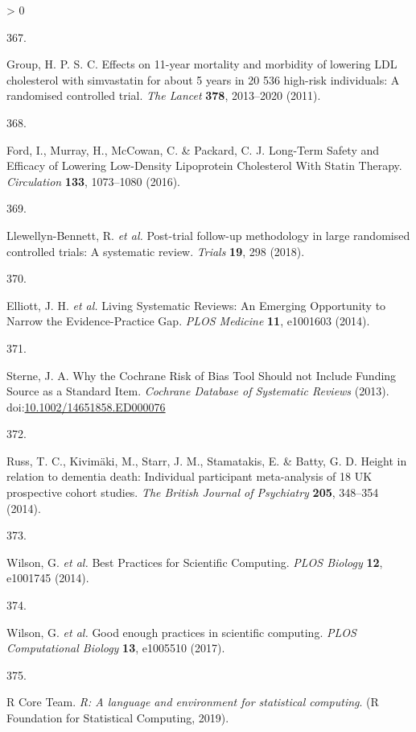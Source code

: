\documentclass[a4paper, twoside]{templates/ociamthesis}
\newlength{\cslhangindent}
\newlength{\csllabelwidth}
\newenvironment{CSLReferences}[3] %
 {%
  \setlength{\parindent}{0pt}
  \ifodd #1 \everypar{\setlength{\hangindent}{\cslhangindent}}\ignorespaces\fi
  \ifnum #2 > 0
  \setlength{\parskip}{#2\baselineskip}
  \fi
 }%
 {}
\newcommand{\CSLLeftMargin}[1]{\parbox[t]{\maxof{\widthof{#1}}{\csllabelwidth}}{#1}}
\newcommand{\CSLRightInline}[1]{\parbox[t]{\linewidth - \csllabelwidth}{#1}}
\begin{document}
\begin{CSLReferences}{0}{0}
\leavevmode\hypertarget{ref-group2011}{}%
\CSLLeftMargin{367. }
\CSLRightInline{Group, H. P. S. C. Effects on 11-year mortality and morbidity of lowering {LDL} cholesterol with simvastatin for about 5 years in 20 536 high-risk individuals: A randomised controlled trial. \emph{The Lancet} \textbf{378}, 2013--2020 (2011).}

\leavevmode\hypertarget{ref-ford2016}{}%
\CSLLeftMargin{368. }
\CSLRightInline{Ford, I., Murray, H., McCowan, C. \& Packard, C. J. Long-{Term Safety} and {Efficacy} of {Lowering Low}-{Density Lipoprotein Cholesterol With Statin Therapy}. \emph{Circulation} \textbf{133}, 1073--1080 (2016).}

\leavevmode\hypertarget{ref-llewellyn-bennett2018}{}%
\CSLLeftMargin{369. }
\CSLRightInline{Llewellyn-Bennett, R. \emph{et al.} Post-trial follow-up methodology in large randomised controlled trials: A systematic review. \emph{Trials} \textbf{19}, 298 (2018).}

\leavevmode\hypertarget{ref-elliott2014}{}%
\CSLLeftMargin{370. }
\CSLRightInline{Elliott, J. H. \emph{et al.} Living {Systematic Reviews}: An {Emerging Opportunity} to {Narrow} the {Evidence}-{Practice Gap}. \emph{PLOS Medicine} \textbf{11}, e1001603 (2014).}

\leavevmode\hypertarget{ref-sterne2013}{}%
\CSLLeftMargin{371. }
\CSLRightInline{Sterne, J. A. Why the {Cochrane Risk} of {Bias Tool Should} not {Include Funding Source} as a {Standard Item}. \emph{Cochrane Database of Systematic Reviews} (2013). doi:\href{https://doi.org/10.1002/14651858.ED000076}{10.1002/14651858.ED000076}}

\leavevmode\hypertarget{ref-russ2014}{}%
\CSLLeftMargin{372. }
\CSLRightInline{Russ, T. C., Kivimäki, M., Starr, J. M., Stamatakis, E. \& Batty, G. D. Height in relation to dementia death: Individual participant meta-analysis of 18 {UK} prospective cohort studies. \emph{The British Journal of Psychiatry} \textbf{205}, 348--354 (2014).}

\leavevmode\hypertarget{ref-wilson2014}{}%
\CSLLeftMargin{373. }
\CSLRightInline{Wilson, G. \emph{et al.} Best {Practices} for {Scientific Computing}. \emph{PLOS Biology} \textbf{12}, e1001745 (2014).}

\leavevmode\hypertarget{ref-wilson2017}{}%
\CSLLeftMargin{374. }
\CSLRightInline{Wilson, G. \emph{et al.} Good enough practices in scientific computing. \emph{PLOS Computational Biology} \textbf{13}, e1005510 (2017).}

\leavevmode\hypertarget{ref-R-base}{}%
\CSLLeftMargin{375. }
\CSLRightInline{R Core Team. \emph{R: A language and environment for statistical computing}. ({R Foundation for Statistical Computing}, 2019).}


\end{CSLReferences}
\end{document}
